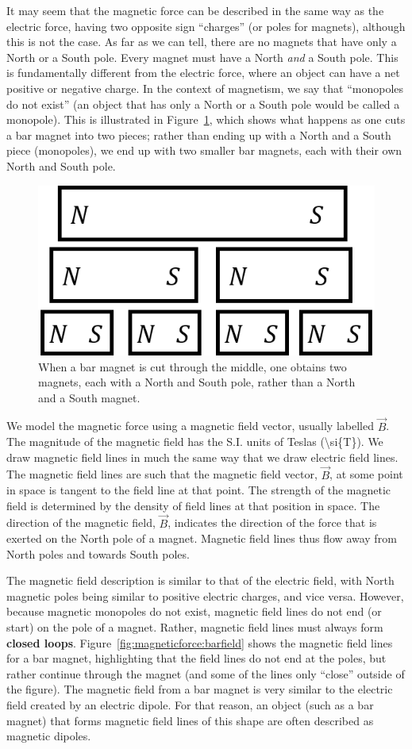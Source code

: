 It may seem that the magnetic force can be described in the same way as the electric force, having two opposite sign ``charges'' (or poles for magnets), although this is not the case. As far as we can tell, there are no magnets that have only a North or a South pole. Every magnet must have a North \textit{and} a South pole. This is fundamentally different from the electric force, where an object can have a net positive or negative charge. In the context of magnetism, we say that ``monopoles do not exist'' (an object that has only a North or a South pole would be called a monopole). This is illustrated in Figure~\ref{fig:magneticforce:magnetcut}, which shows what happens as one cuts a bar magnet into two pieces; rather than ending up with a North and a South piece (monopoles), we end up with two smaller bar magnets, each with their own North and South pole.

\begin{figure}[!htbp]
\centering
\includegraphics[width=0.4\linewidth]{files/magnetcut-3c8cc38e7c5df139fbe1d25b9b3412a6.png}
\caption[]{When a bar magnet is cut through the middle, one obtains two magnets, each with a North and South pole, rather than a North and a South magnet.}
\label{fig:magneticforce:magnetcut}
\end{figure}

We model the magnetic force using a magnetic field vector, usually labelled $\vec B$. The magnitude of the magnetic field has the S.I. units of Teslas ({\textbackslash}si\{T\}). We draw magnetic field lines in much the same way that we draw electric field lines. The magnetic field lines are such that the magnetic field vector, $\vec B$, at some point in space is tangent to the field line at that point. The strength of the magnetic field is determined by the density of field lines at that position in space. The direction of the magnetic field, $\vec B$, indicates the direction of the force that is exerted on the North pole of a magnet. Magnetic field lines thus flow away from North poles and towards South poles.

The magnetic field description is similar to that of the electric field, with North magnetic poles being similar to positive electric charges, and vice versa.  However, because magnetic monopoles do not exist, magnetic field lines do not end (or start) on the pole of a magnet. Rather, magnetic field lines must always form \textbf{closed loops}. Figure~\ref{fig:magneticforce:barfield} shows the magnetic field lines for a bar magnet, highlighting that the field lines do not end at the poles, but rather continue through the magnet (and some of the lines only ``close'' outside of the figure). The magnetic field from a bar magnet is very similar to the electric field created by an electric dipole. For that reason, an object (such as a bar magnet) that forms magnetic field lines of this shape are often described as magnetic dipoles.

